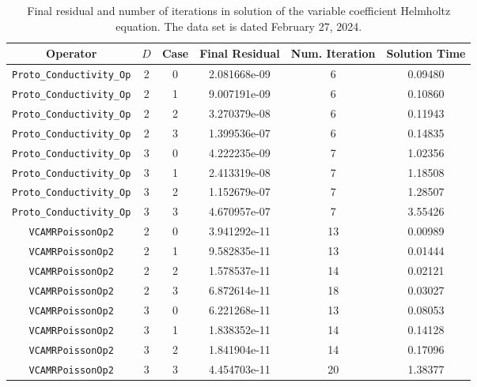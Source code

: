 \documentclass{article}
\begin{document}
\begin{itemize}
\begin{small}
\begin{table}
\begin{center}
\begin{tabular}{|c|c|c|c|c||c|} \hline
 Operator                   & $D$ & Case & Final Residual &
 Num. Iteration & Solution Time\\
\hline
 {\tt Proto\_Conductivity\_Op}    & 2   & 0    & 2.081668e-09   &  6     & 0.09480   \\
 {\tt Proto\_Conductivity\_Op}    & 2   & 1    & 9.007191e-09   &  6     & 0.10860   \\
 {\tt Proto\_Conductivity\_Op}    & 2   & 2    & 3.270379e-08   &  6     & 0.11943   \\
 {\tt Proto\_Conductivity\_Op}    & 2   & 3    & 1.399536e-07   &  6     & 0.14835   \\
 {\tt Proto\_Conductivity\_Op}    & 3   & 0    & 4.222235e-09   &  7     & 1.02356   \\
 {\tt Proto\_Conductivity\_Op}    & 3   & 1    & 2.413319e-08   &  7     & 1.18508   \\
 {\tt Proto\_Conductivity\_Op}    & 3   & 2    & 1.152679e-07   &  7     & 1.28507   \\
 {\tt Proto\_Conductivity\_Op}    & 3   & 3    & 4.670957e-07   &  7     & 3.55426   \\
\hline                                                           
 {\tt VCAMRPoissonOp2}            & 2   & 0    & 3.941292e-11   &  13    & 0.00989   \\
 {\tt VCAMRPoissonOp2}            & 2   & 1    & 9.582835e-11   &  13    & 0.01444   \\
 {\tt VCAMRPoissonOp2}            & 2   & 2    & 1.578537e-11   &  14    & 0.02121   \\
 {\tt VCAMRPoissonOp2}            & 2   & 3    & 6.872614e-11   &  18    & 0.03027   \\
 {\tt VCAMRPoissonOp2}            & 3   & 0    & 6.221268e-11   &  13    & 0.08053   \\
 {\tt VCAMRPoissonOp2}            & 3   & 1    & 1.838352e-11   &  14    & 0.14128   \\
 {\tt VCAMRPoissonOp2}            & 3   & 2    & 1.841904e-11   &  14    & 0.17096   \\
 {\tt VCAMRPoissonOp2}            & 3   & 3    & 4.454703e-11   &  20    & 1.38377   \\
\hline
\end{tabular}
\end{center}
\label{tab::conductivity3}
\caption
    {
      Final residual and number of iterations in solution of the variable
      coefficient Helmholtz equation.
      The data set is dated February 27, 2024.
    }
\end{table}
\end{small}


\end{itemize}
\end{document}
